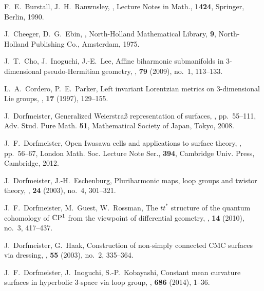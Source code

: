 \documentclass[12pt]{amsart}
\theoremstyle{definition}
\theoremstyle{remark}
\numberwithin{equation}{section}
\begin{document}
\begin{thebibliography}{10}
 F.~E.~Burstall, J.~H.~Ranwnsley,
 ,
 \newblock Lecture Notes in Math., \textbf{1424}, Springer, Berlin, 1990.

 J.~Cheeger, D.~G.~Ebin,
 ,
 \newblock North-Holland Mathematical Library, \textbf{9},
 North-Holland Publishing Co., Amsterdam, 1975.

 J.~T.~Cho, J.~Inoguchi, J.-E.~Lee,
 \newblock Affine biharmonic submanifolds in 3-dimensional pseudo-Hermitian geometry,
 , \textbf{79} (2009), no.~1, 113--133.

 L.~A.~Cordero, P.~E.~Parker,
 \newblock Left invariant Lorentzian metrics on $3$-dimensional Lie groups, 
 , \textbf{17} (1997), 129--155.

 J.~Dorfmeister,
 \newblock Generalized Weierstra{\ss} representation of surfaces, 
 , 
 pp.~55--111, Adv. Stud. Pure Math. \textbf{51}, Mathematical Society of Japan, Tokyo, 
 2008.

 J.~F.~Dorfmeister, 
 \newblock Open Iwasawa cells and applications to surface theory, 
 , 
 pp.~56--67, London Math. Soc. Lecture Note Ser., \textbf{394}, Cambridge Univ. Press, 
 Cambridge, 2012.

 J.~Dorfmeister, J.-H.~Eschenburg,
 \newblock Pluriharmonic maps, loop groups and twistor theory,
 ,  \textbf{24} (2003), no.~4, 
 301--321.

  J.~F.~Dorfmeister, M.~Guest, W.~Rossman,
 \newblock The {$tt^\ast$} structure of the quantum cohomology of
 {$\mathbb C{\rm P}^1$} from the viewpoint of differential geometry,
 , \textbf{14} (2010), no.~3, 417--437.

 J.~Dorfmeister, G.~Haak, 
 \newblock Construction of non-simply connected CMC surfaces via dressing, 
 , \textbf{55} (2003), no.~2, 
 335--364.

 J.~F.~Dorfmeister, J.~Inoguchi, S.-P.~Kobayashi,
 \newblock Constant mean curvature surfaces in hyperbolic 3-space via loop group, 
 , \textbf{686} (2014), 1--36.


\end{thebibliography}
\end{document}
